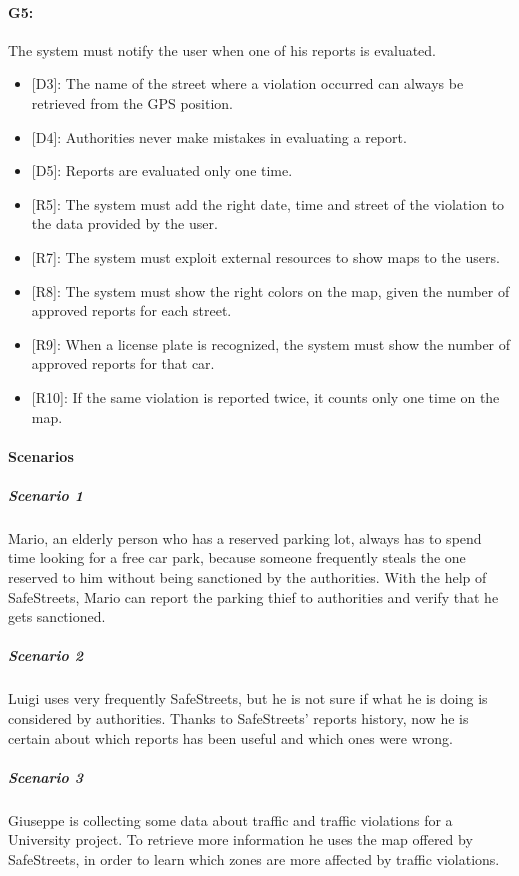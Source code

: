 \documentclass[12pt,a4paper]{report}
\begin{document}
			\paragraph {G5:} The system must notify the user when one of his reports is evaluated.
			\begin{itemize}
				\item{[D3]}: The name of the street where a violation occurred can always be retrieved from the GPS position.
				\item{[D4]}: Authorities never make mistakes in evaluating a report.
				\item{[D5]}: Reports are evaluated only one time.
			\end{itemize}
			\begin{itemize}
				\item{[R5]}: The system must add the right date, time and street of the violation to the data provided by the user.
				\item{[R7]}: The system must exploit external resources to show maps to the users.
				\item{[R8]}: The system must show the right colors on the map, given the number of approved reports for each street.
				\item{[R9]}: When a license plate is recognized, the system must show the number of approved reports for that car.
				\item{[R10]}: If the same violation is reported twice, it counts only one time on the map.
			\end{itemize}

\paragraph{Scenarios}

				\subparagraph{Scenario 1}
					Mario, an elderly person who has a reserved parking lot, always has to spend time looking for a free
					car park, because someone frequently steals the one reserved to him without being sanctioned by the
					authorities. With the help of SafeStreets, Mario can report the parking thief to authorities and verify
					that he gets sanctioned.
					
				\subparagraph{Scenario 2}
					Luigi uses very frequently SafeStreets, but he is not sure if what he is doing is considered by authorities.
					Thanks to SafeStreets' reports history, now he is certain about which reports has been useful and which ones
					were wrong.
					
				\subparagraph{Scenario 3}
					Giuseppe is collecting some data about traffic and traffic violations for a University project. To retrieve more
					information he uses the map offered by SafeStreets, in order to learn which zones are more affected by traffic violations.
					
\end{document}
